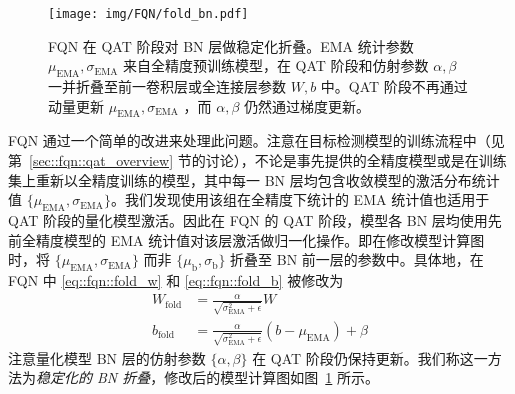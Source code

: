 \documentclass[
  fontset = mac,
]{shtthesis}
\providecommand{\EMA}[1]{{ #1 }_{\mathrm{EMA}}}
\providecommand{\Batch}[1]{{ #1 }_{\mathrm{b}}}
\providecommand{\Fold}[1]{{ #1 }_{\mathrm{fold}}}
\begin{document}
\begin{figure}[htb]
  \centering
  \texttt{[image: img/FQN/fold\_bn.pdf]}
  \caption{FQN 在 QAT 阶段对 BN 层做稳定化折叠。EMA 统计参数 $\EMA{\mu}, \EMA{\sigma}$ 来自全精度预训练模型，在 QAT 阶段和仿射参数 $\alpha, \beta$ 一并折叠至前一卷积层或全连接层参数 $W, b$ 中。QAT 阶段不再通过动量更新 $\EMA{\mu}, \EMA{\sigma}$ ，而 $\alpha, \beta$ 仍然通过梯度更新。}
  \label{img::fqn::foldbn_stable}
\end{figure}

FQN 通过一个简单的改进来处理此问题。注意在目标检测模型的训练流程中（见第~\ref{sec::fqn::qat_overview} 节的讨论），不论是事先提供的全精度模型或是在训练集上重新以全精度训练的模型，其中每一 BN 层均包含收敛模型的激活分布统计值 $\{\EMA{\mu}, \EMA{\sigma}\}$。我们发现使用该组在全精度下统计的 EMA 统计值也适用于 QAT 阶段的量化模型激活。因此在 FQN 的 QAT 阶段，模型各 BN 层均使用先前全精度模型的 EMA 统计值对该层激活做归一化操作。即在修改模型计算图时，将 $\{\EMA{\mu}, \EMA{\sigma}\}$ 而非 $\{\Batch{\mu}, \Batch{\sigma}\}$ 折叠至 BN 前一层的参数中。具体地，在 FQN 中 \eqref{eq::fqn::fold_w} 和 \eqref{eq::fqn::fold_b} 被修改为
\begin{align}
  \Fold{W} &= \frac{\alpha}{\sqrt{\EMA{\sigma}^2 + \epsilon}} W \label{eq::fqn::fold_w_stable} \\
  \Fold{b} &= \frac{\alpha}{\sqrt{\EMA{\sigma}^2 + \epsilon}} (b - \EMA{\mu}) + \beta \label{eq::fqn::fold_b_stable}
\end{align}
注意量化模型 BN 层的仿射参数 $\{\alpha, \beta\}$ 在 QAT 阶段仍保持更新。我们称这一方法为\emph{稳定化的 BN 折叠}，修改后的模型计算图如图~\ref{img::fqn::foldbn_stable} 所示。
\end{document}
